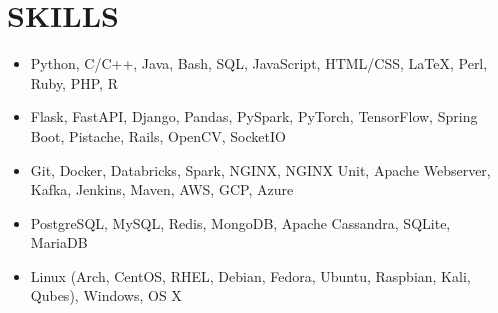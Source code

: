 \documentclass[11pt,letterpaper]{article}
\begin{document}







  \section*{SKILLS}

  \begin{itemize}
    \item{
      {}
      Python, C/C++, Java, Bash, SQL, JavaScript, HTML/CSS, \LaTeX, Perl, Ruby, PHP, R
    }

    \item{
      {}
      Flask, FastAPI, Django, Pandas, PySpark, PyTorch, TensorFlow, Spring Boot, Pistache, Rails, OpenCV, SocketIO%
    }

    \item{
      {}
      Git, Docker, Databricks, Spark, NGINX, NGINX Unit, Apache Webserver, Kafka, Jenkins, Maven, AWS, GCP, Azure
    }

    \item{
      {}
      PostgreSQL, MySQL, Redis, MongoDB, Apache Cassandra, SQLite, MariaDB
    }


    \item{
      {}
      Linux (Arch, CentOS, RHEL, Debian, Fedora, Ubuntu, Raspbian, Kali, Qubes), Windows, OS X
    }
  \end{itemize}
\end{document}
